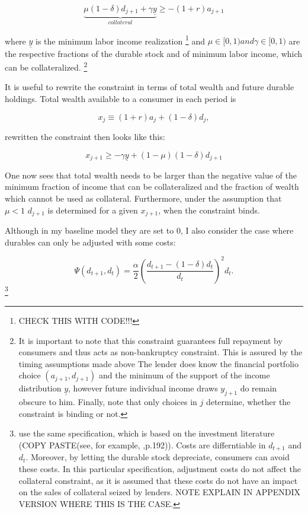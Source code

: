 \documentclass[a4paper,12pt]{article}
\begin{document}
\begin{equation}
\underbrace{\mu(1-\delta)d_{j+1} + \gamma\underline{y}}_{collateral} \geq -(1+r)a_{j+1}
\end{equation}

where $\underline{y}$ is the minimum labor income realization \footnote{CHECK THIS WITH CODE!!!} and $\mu \in [0,1) and \gamma \in [0,1)$ are the respective fractions of the durable stock and of minimum labor income, which can be collateralized.
\footnote{It is important to note that this constraint guarantees full repayment by consumers and thus acts as non-bankruptcy constraint. This is assured by the timing assumptions made above \textendash The lender does know the financial portfolio choice $(a_{j+1},d_{j+1})$ and the minimum of the support of the income distribution $\underline{y}$, however future individual income draws $y_{j+1}$ do remain obscure to him. Finally, note that only choices in $j$ determine, whether the constraint is binding or not. }

It is useful to rewrite the constraint in terms of total wealth and future durable holdings. Total wealth available to a consumer in each period is 

\begin{equation}
x_{j} \equiv (1+r)a_{j} + (1-\delta)d_{j},
\end{equation}

rewritten the constraint then looks like this:

\begin{equation}
x_{j+1} \geq -\gamma\underline{y}+(1-\mu)(1-\delta)d_{j+1}
\end{equation}

One now sees that total wealth needs to be larger than the negative value of the minimum fraction of income that can be collateralized and the fraction of wealth which cannot be used as collateral. Furthermore, under the assumption that $\mu < 1$ $d_{j+1}$ is determined for a given $x_{j+1}$, when the constraint binds.

Although in my baseline model they are set to 0, I also consider the case where durables can only be adjusted with some costs: 

\begin{equation}
\Psi(d_{t+1},d_{t})=\frac{\alpha}{2}\left(\frac{d_{t+1}-(1-\delta)d_{t}}{d_{t}}\right)^2d_{t}.
\end{equation}\footnote{\citep{hintermaier2010} use the same specification, which is based on the investment literature (COPY PASTE(see, for example, \cite{adda2003dynamics},p.192)). Costs are differntiable in $d_{t+1}$ and $d_{t}$. Moreover, by letting the durable stock depreciate, consumers can avoid these costs. In this particular specification, adjustment costs do not affect the collateral constraint, as it is assumed that these costs do not have an impact on the sales of collateral seized by lenders. NOTE \citep{hintermaier2010} EXPLAIN IN APPENDIX VERSION WHERE THIS IS THE CASE.}
\end{document}
